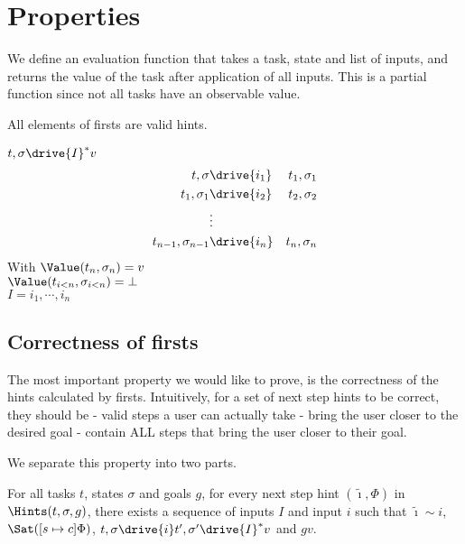 
\section{Properties}
\label{sec:properties}

We define an evaluation function that takes a task, state and list of inputs,
and returns the value of the task after application of all inputs.
This is a partial function since not all tasks have an observable value.

All elements of firsts are valid hints.

\begin{definition}[Evaluate]
  $t,\sigma\drive{I}^* v$
  \begin{align*}
    t,\sigma             & \drive{i_1} & t_1,\sigma_1\\
    t_1,\sigma_1         & \drive{i_2} & t_2,\sigma_2\\
                         & \vdots   & \\
    t_{n-1},\sigma_{n-1} & \drive{i_n} & t_n,\sigma_n
  \end{align*}
  With $\Value(t_n,\sigma_n)=v$\\
  $\Value(t_{i<n},\sigma_{i<n})=\bot$\\
  $I=i_1,\cdots,i_n$
\end{definition}

\subsection{Correctness of firsts}

The most important property we would like to prove, is the correctness of the hints calculated by firsts.
Intuitively, for a set of next step hints to be correct, they should be
- valid steps a user can actually take
- bring the user closer to the desired goal
- contain ALL steps that bring the user closer to their goal.

We separate this property into two parts.


\begin{lemma}
  \label{lem:soundfirsts}

For all tasks $t$, states $\sigma$ and goals $g$,
for every next step hint $(\tilde{\imath},\Phi)$ in $\Hints(t,\sigma,g)$,
there exists a sequence of inputs $I$ and input $i$ such that $\tilde{\imath}\sim i$,
$\Sat([s\mapsto c]\Phi)$, $t,\sigma\drive{i} t',\sigma'\drive{I}^* v$ and $gv$.
\end{lemma}

